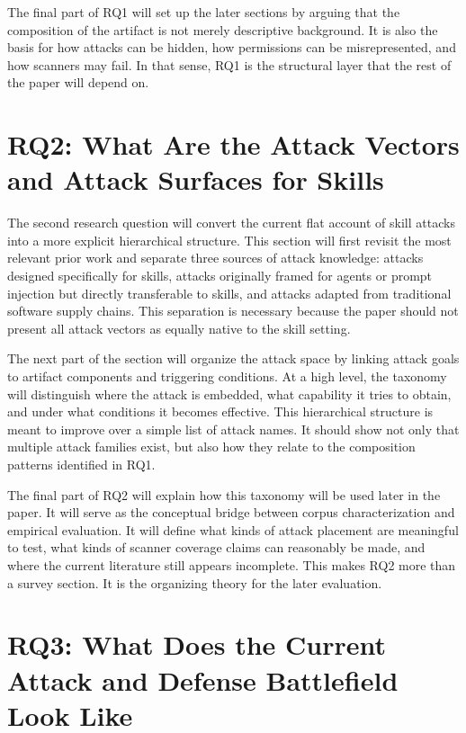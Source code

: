 \documentclass[conference]{IEEEtran}
\begin{document}
The final part of RQ1 will set up the later sections by arguing that the
composition of the artifact is not merely descriptive background. It is
also the basis for how attacks can be hidden, how permissions can be
misrepresented, and how scanners may fail. In that sense, RQ1 is the
structural layer that the rest of the paper will depend on.

\section{RQ2: What Are the Attack Vectors and Attack Surfaces for Skills}

The second research question will convert the current flat account of
skill attacks into a more explicit hierarchical structure. This section
will first revisit the most relevant prior work and separate three
sources of attack knowledge: attacks designed specifically for skills,
attacks originally framed for agents or prompt injection but directly
transferable to skills, and attacks adapted from traditional software
supply chains. This separation is necessary because the paper should not
present all attack vectors as equally native to the skill setting.

The next part of the section will organize the attack space by linking
attack goals to artifact components and triggering conditions. At a high
level, the taxonomy will distinguish where the attack is embedded, what
capability it tries to obtain, and under what conditions it becomes
effective. This hierarchical structure is meant to improve over a simple
list of attack names. It should show not only that multiple attack
families exist, but also how they relate to the composition patterns
identified in RQ1.

The final part of RQ2 will explain how this taxonomy will be used later
in the paper. It will serve as the conceptual bridge between corpus
characterization and empirical evaluation. It will define what kinds of
attack placement are meaningful to test, what kinds of scanner coverage
claims can reasonably be made, and where the current literature still
appears incomplete. This makes RQ2 more than a survey section. It is
the organizing theory for the later evaluation.

\section{RQ3: What Does the Current Attack and Defense Battlefield Look Like}
\end{document}
